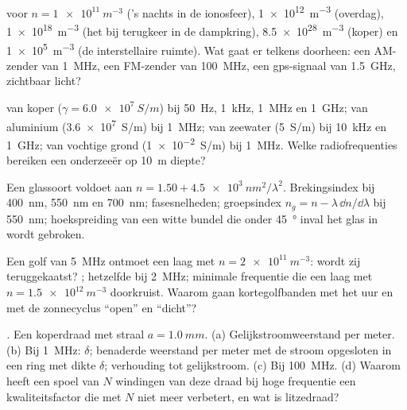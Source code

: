 \begin{exercise}[$\star$]\label{exo:b2:waves-in-media:1}
 voor $n = \qty{1e11}{m^{-3}}$ ('s nachts in de ionosfeer),
\qty{1e12}{m^{-3}} (overdag), \qty{1e18}{m^{-3}} (het  bij terugkeer
in de dampkring), \qty{8.5e28}{m^{-3}} (koper) en \qty{1e5}{m^{-3}} (de
interstellaire ruimte). Wat gaat er telkens doorheen: een AM-zender van
\qty{1}{MHz}, een FM-zender van \qty{100}{MHz}, een gps-signaal van
\qty{1.5}{GHz}, zichtbaar licht?
\end{exercise}

\begin{exercise}[$\star$]\label{exo:b2:waves-in-media:2}
 van koper ($\gamma = \qty{6.0e7}{S/m}$) bij \qty{50}{Hz},
\qty{1}{kHz}, \qty{1}{MHz} en \qty{1}{GHz}; van aluminium (\qty{3.6e7}{S/m})
bij \qty{1}{MHz}; van zeewater (\qty{5}{S/m}) bij \qty{10}{kHz} en
\qty{1}{GHz}; van vochtige grond (\qty{1e-2}{S/m}) bij \qty{1}{MHz}. Welke
radiofrequenties bereiken een onderzeeër op \qty{10}{m} diepte?
\end{exercise}

\begin{exercise}[$\star$]\label{exo:b2:waves-in-media:3}
Een glassoort voldoet aan $n = 1.50 + \qty{4.5e3}{nm^2}/\lambda^2$.
Brekingsindex bij \qty{400}{nm}, \qty{550}{nm} en \qty{700}{nm};
fasesnelheden; groepsindex $n_g = n -
\lambda\,\dd n/\dd\lambda$ bij
\qty{550}{nm}; hoekspreiding van een witte bundel die onder
\qty{45}{\degree} inval het glas in wordt gebroken.
\end{exercise}

\begin{exercise}[$\star$]\label{exo:b2:waves-in-media:4}
Een golf van \qty{5}{MHz} ontmoet een laag met $n = \qty{2e11}{m^{-3}}$:
wordt zij teruggekaatst? ; hetzelfde bij \qty{2}{MHz}; minimale
frequentie die een laag met $n = \qty{1.5e12}{m^{-3}}$ doorkruist. Waarom
gaan kortegolfbanden met het uur en met de zonnecyclus ``open'' en
``dicht''?
\end{exercise}

\begin{exercise}[$\star\star$]\label{exo:b2:waves-in-media:5}
\emph{.} Een koperdraad met straal $a = \qty{1.0}{mm}$.
(a) Gelijkstroomweerstand per meter. (b) Bij \qty{1}{MHz}: $\delta$;
benaderde weerstand per meter met de stroom opgesloten in een ring met dikte
$\delta$; verhouding tot gelijkstroom. (c) Bij \qty{100}{MHz}. (d) Waarom
heeft een spoel van $N$ windingen van deze draad bij hoge frequentie een
kwaliteitsfactor die met $N$ niet meer verbetert, en wat is litzedraad?
\end{exercise}

